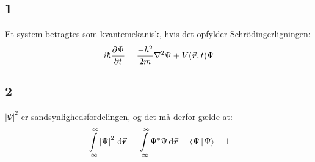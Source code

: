 \documentclass[../Kvantemekanik.tex]{subfiles}
\begin{document}
\subsection*{1}
Et system betragtes som kvantemekanisk, hvis det opfylder Schrödingerligningen:
\begin{equation}
    i\hbar\frac{\partial^{}{\Psi}}{\partial {t}^{}}=\frac{-\hbar^{2}}{2m}\nabla^{2}\Psi+V({\vec{\boldsymbol{r}}},t)\Psi
\label{kvant:eq:sch}
\end{equation}
\subsection*{2}
$|\Psi|^2$ er sandsynlighedsfordelingen, og det må derfor gælde at:
\begin{equation}
    \integral{\abs{\Psi}^{2}}{\v r}{-\infty}{\infty}=\integral{\Psi^{*}\Psi}{\v r}{-\infty}{\infty}=\braket{\Psi}{\Psi}=1
    \label{kvant:eq:norm}
\end{equation}
\end{document}
